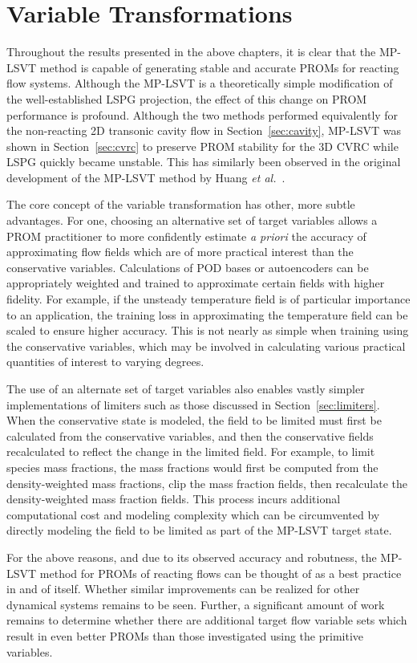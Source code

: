 \section{Variable Transformations}

Throughout the results presented in the above chapters, it is clear that the MP-LSVT method is capable of generating stable and accurate PROMs for reacting flow systems. Although the MP-LSVT is a theoretically simple modification of the well-established LSPG projection, the effect of this change on PROM performance is profound. Although the two methods performed equivalently for the non-reacting 2D transonic cavity flow in Section~\ref{sec:cavity}, MP-LSVT was shown in Section~\ref{sec:cvrc} to preserve PROM stability for the 3D CVRC while LSPG quickly became unstable. This has similarly been observed in the original development of the MP-LSVT method by Huang \textit{et al.}~\cite{Huang2022}.

The core concept of the variable transformation has other, more subtle advantages. For one, choosing an alternative set of target variables allows a PROM practitioner to more confidently estimate \textit{a priori} the accuracy of approximating flow fields which are of more practical interest than the conservative variables. Calculations of POD bases or autoencoders can be appropriately weighted and trained to approximate certain fields with higher fidelity. For example, if the unsteady temperature field is of particular importance to an application, the training loss in approximating the temperature field can be scaled to ensure higher accuracy. This is not nearly as simple when training using the conservative variables, which may be involved in calculating various practical quantities of interest to varying degrees.   

The use of an alternate set of target variables also enables vastly simpler implementations of limiters such as those discussed in Section~\ref{sec:limiters}. When the conservative state is modeled, the field to be limited must first be calculated from the conservative variables, and then the conservative fields recalculated to reflect the change in the limited field. For example, to limit species mass fractions, the mass fractions would first be computed from the density-weighted mass fractions, clip the mass fraction fields, then recalculate the density-weighted mass fraction fields. This process incurs additional computational cost and modeling complexity which can be circumvented by directly modeling the field to be limited as part of the MP-LSVT target state.

For the above reasons, and due to its observed accuracy and robutness, the MP-LSVT method for PROMs of reacting flows can be thought of as a best practice in and of itself. Whether similar improvements can be realized for other dynamical systems remains to be seen. Further, a significant amount of work remains to determine whether there are additional target flow variable sets which result in even better PROMs than those investigated using the primitive variables.